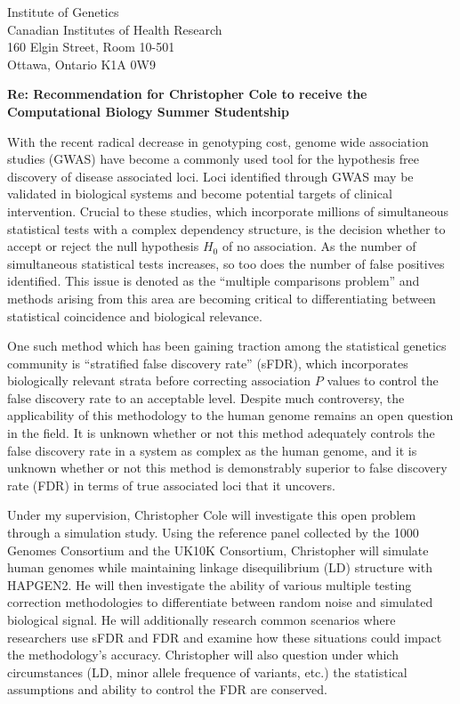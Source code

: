 \documentclass{letter}
\begin{document}
\begin{letter}{Institute of Genetics \\ Canadian Institutes of Health Research \\ 160 Elgin Street, Room 10-501 \\ Ottawa, Ontario K1A 0W9}
\opening{\textbf{Re: Recommendation for Christopher Cole to receive the Computational Biology Summer Studentship}}
\thispagestyle{fancy}
\setlength{\parindent}{0.5cm}


With the recent radical decrease in genotyping cost, genome wide association studies (GWAS) have become a commonly used tool for the hypothesis free discovery of disease associated loci. Loci identified through GWAS may be validated in biological systems and become potential targets of clinical intervention. Crucial to these studies, which incorporate millions of simultaneous statistical tests with a complex dependency structure, is the decision whether to accept or reject the null hypothesis $H_0$ of no association. As the number of simultaneous statistical tests increases, so too does the number of false positives identified. This issue is denoted as the ``multiple comparisons problem'' and methods arising from this area are becoming critical to differentiating between statistical coincidence and biological relevance. 

One such method which has been gaining traction among the statistical genetics community is ``stratified false discovery rate'' (sFDR), which incorporates biologically relevant strata before correcting association $P$ values to control the false discovery rate to an acceptable level. Despite much controversy, the applicability of this methodology to the human genome remains an open question in the field. It is unknown whether or not this method adequately controls the false discovery rate in a system as complex as the human genome, and it is unknown whether or not this method is demonstrably superior to false discovery rate (FDR) in terms of true associated loci that it uncovers. 

Under my supervision, Christopher Cole will investigate this open problem through a simulation study. Using the reference panel collected by the 1000 Genomes Consortium and the UK10K Consortium, Christopher will simulate human genomes while maintaining linkage disequilibrium (LD) structure with HAPGEN2. He will then investigate the ability of various multiple testing correction methodologies to differentiate between random noise and simulated biological signal. He will additionally research common scenarios where researchers use sFDR and FDR and examine how these situations could impact the methodology's accuracy. Christopher will also question under which circumstances (LD, minor allele frequence of variants, etc.) the statistical assumptions and ability to control the FDR are conserved.  


\end{letter}
\end{document}
